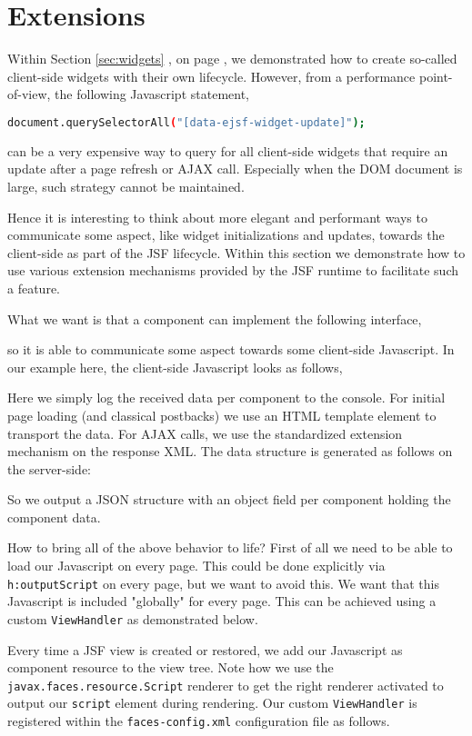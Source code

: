 \section{Extensions}
Within Section \ref{sec:widgets} , on page \pageref{sec:widgets}, we demonstrated how to create so-called client-side widgets with their own lifecycle.
However, from a performance point-of-view, the following Javascript statement,
\begin{lstlisting}[language=bash]
	document.querySelectorAll("[data-ejsf-widget-update]");
\end{lstlisting}
can be a very expensive way to query for all client-side widgets that require an update after a page refresh or AJAX call.
Especially when the DOM document is large, such strategy cannot be maintained.

Hence it is interesting to think about more elegant and performant ways to communicate some aspect, like widget initializations and updates, towards the client-side as part of the JSF lifecycle.
Within this section we demonstrate how to use various extension mechanisms provided by the JSF runtime to facilitate such a feature.

What we want is that a component can implement the following interface,

so it is able to communicate some aspect towards some client-side Javascript.
In our example here, the client-side Javascript looks as follows,

Here we simply log the received data per component to the console.
For initial page loading (and classical postbacks) we use an HTML template element to transport the data.
For AJAX calls, we use the standardized extension mechanism on the response XML.
The data structure is generated as follows on the server-side:

So we output a JSON structure with an object field per component holding the component data.

How to bring all of the above behavior to life?
First of all we need to be able to load our Javascript on every page.
This could be done explicitly via \texttt{h:outputScript} on every page, but we want to avoid this.
We want that this Javascript is included "globally" for every page.
This can be achieved using a custom \texttt{ViewHandler} as demonstrated below.

Every time a JSF view is created or restored, we add our Javascript as component resource to the view tree.
Note how we use the \texttt{javax.faces.resource.Script} renderer to get the right renderer activated to output our \texttt{script} element during rendering.
Our custom \texttt{ViewHandler} is registered within the \texttt{faces-config.xml} configuration file as follows.


